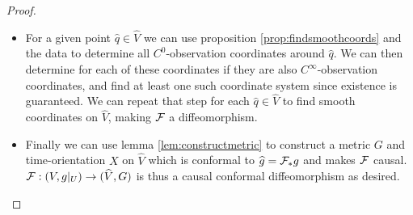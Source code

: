 \begin{proof}
\begin{itemize}
    
    
    
    \item For a given point $\widehat{q}\in \widehat{V}$ we can use proposition \ref{prop:findsmoothcoords} and the data to determine all $C^0$-observation coordinates around $\widehat{q}$. We can then determine for each of these coordinates if they are also $C^\infty$-observation coordinates, and find at least one such coordinate system since existence is guaranteed. We can repeat that step for each $\widehat{q}\in \widehat{V}$ to find smooth coordinates on $\widehat{V}$, making $\mathcal{F}$ a diffeomorphism. 
    
    \item Finally we can use lemma \ref{lem:constructmetric} to construct a metric $G$ and time-orientation $X$ on $\widehat{V}$ which is conformal to $\widehat{g}=\mathcal{F}_*g$ and makes $\mathcal{F}$ causal. 
    $\mathcal{F}:(V,g\rvert_U)\to (\widehat{V},G)$ is thus a causal conformal diffeomorphism as desired.\qedhere
    \end{itemize}
\end{proof}

